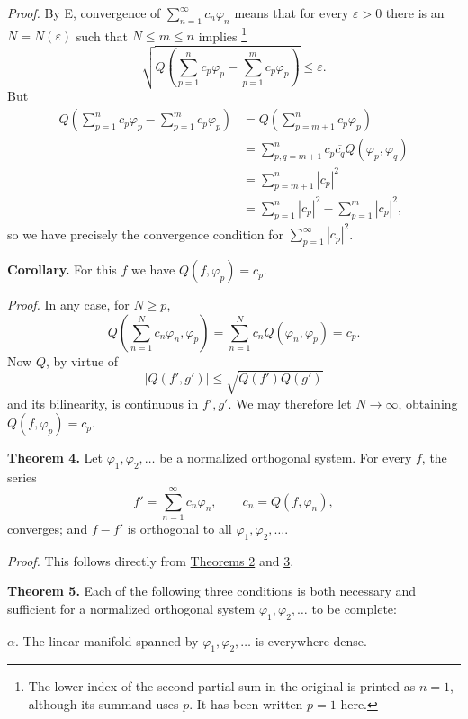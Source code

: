 \documentclass[fontsize=13pt,paper=b5,twoside,bookmarkpackage=false]{scrartcl}
\newcounter{translatornote}
\newcommand{\tnote}[1]{%
  \begingroup\stepcounter{translatornote}%
  \renewcommand{\thefootnote}{T\arabic{translatornote}}%
  \footnote[0]{#1}\endgroup}
\begin{document}
\par\noindent\textit{Proof.}
By E, convergence of $\sum_{n=1}^{\infty}c_n\varphi_n$ means that for every $\varepsilon>0$ there is an $N=N(\varepsilon)$ such that $N\le m\le n$ implies\tnote{The lower index of the second partial sum in the original is printed as $n=1$, although its summand uses $p$. It has been written $p=1$ here.}
\[
\sqrt{Q\!\left(\sum_{p=1}^{n}c_p\varphi_p-\sum_{p=1}^{m}c_p\varphi_p\right)}\le\varepsilon.
\]
But
\begin{align*}
Q\!\left(\sum_{p=1}^{n}c_p\varphi_p-\sum_{p=1}^{m}c_p\varphi_p\right)
&=Q\!\left(\sum_{p=m+1}^{n}c_p\varphi_p\right)\\
&=\sum_{p,q=m+1}^{n}c_p\overline{c_q}Q(\varphi_p,\varphi_q)\\
&=\sum_{p=m+1}^{n}|c_p|^2\\
&=\sum_{p=1}^{n}|c_p|^2-\sum_{p=1}^{m}|c_p|^2,
\end{align*}
so we have precisely the convergence condition for $\sum_{p=1}^{\infty}|c_p|^2$.

\par\medskip\noindent\textbf{Corollary.}\label{cor:VI:3}
For this $f$ we have $Q(f,\varphi_p)=c_p$.

\par\noindent\textit{Proof.}
In any case, for $N\ge p$,
\[
Q\!\left(\sum_{n=1}^{N}c_n\varphi_n,\varphi_p\right)
=\sum_{n=1}^{N}c_nQ(\varphi_n,\varphi_p)=c_p.
\]
Now $Q$, by virtue of
\[
|Q(f',g')|\le\sqrt{Q(f')Q(g')}
\]
and its bilinearity, is continuous in $f',g'$. We may therefore let $N\to\infty$, obtaining $Q(f,\varphi_p)=c_p$.

\par\medskip\noindent\textbf{Theorem 4.}\label{thm:VI:4}
Let $\varphi_1,\varphi_2,\ldots$ be a normalized orthogonal system. For every $f$, the series
\[
f'=\sum_{n=1}^{\infty}c_n\varphi_n,\qquad c_n=Q(f,\varphi_n),
\]
converges; and $f-f'$ is orthogonal to all $\varphi_1,\varphi_2,\ldots$.

\par\noindent\textit{Proof.}
This follows directly from \hyperref[thm:VI:2]{Theorems 2} and \hyperref[thm:VI:3]{3}.

\par\medskip\noindent\textbf{Theorem 5.}\label{thm:VI:5}
Each of the following three conditions is both necessary and sufficient for a normalized orthogonal system $\varphi_1,\varphi_2,\ldots$ to be complete:

\noindent $\alpha$. The linear manifold spanned by $\varphi_1,\varphi_2,\ldots$ is everywhere dense.
\end{document}
